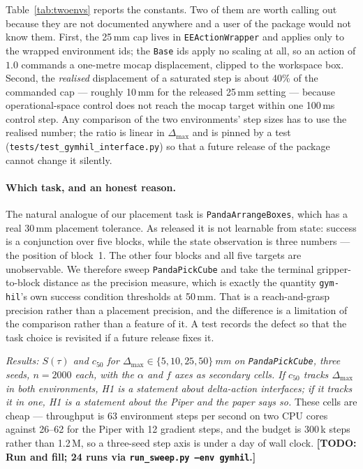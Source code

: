 \documentclass{article}
\newcommand{\todo}[1]{{\color{red}\textbf{[TODO: #1]}}}
\newcommand{\planned}[1]{{\color{blue!70!black}\textit{#1}}}
\newcommand{\dmax}{\Delta_{\max}}
\begin{document}
Table~\ref{tab:twoenvs} reports the constants. Two of them are worth
calling out because they are not documented anywhere and a user of the package
would not know them. First, the 25\,mm cap lives in \texttt{EEActionWrapper}
and applies only to the wrapped environment ids; the \texttt{Base} ids apply no
scaling at all, so an action of $1.0$ commands a one-metre mocap displacement,
clipped to the workspace box. Second, the \emph{realised} displacement of a
saturated step is about 40\% of the commanded cap --- roughly 10\,mm for the
released 25\,mm setting --- because operational-space control does not reach the
mocap target within one 100\,ms control step. Any comparison of the two
environments' step sizes has to use the realised number; the ratio is linear in
$\dmax$ and is pinned by a test
(\texttt{tests/test\_gymhil\_interface.py}) so that a future release of the
package cannot change it silently.

\paragraph{Which task, and an honest reason.}
The natural analogue of our placement task is \texttt{PandaArrangeBoxes},
which has a real 30\,mm placement tolerance. As released it is not learnable
from state: success is a conjunction over five blocks, while the state
observation is three numbers --- the position of block~1. The other four blocks
and all five targets are unobservable. We therefore sweep
\texttt{PandaPickCube} and take the terminal gripper-to-block distance as the
precision measure, which is exactly the quantity \texttt{gym-hil}'s own success
condition thresholds at 50\,mm. That is a reach-and-grasp precision rather than
a placement precision, and the difference is a limitation of the comparison
rather than a feature of it. A test records the defect so that the task choice
is revisited if a future release fixes it.

\planned{Results: $S(\tau)$ and $c_{50}$ for $\dmax \in \{5, 10, 25, 50\}$\,mm
on \texttt{PandaPickCube}, three seeds, $n{=}2000$ each, with the $\alpha$ and
$f$ axes as secondary cells. If $c_{50}$ tracks $\dmax$ in both environments,
H1 is a statement about delta-action interfaces; if it tracks it in one, H1 is
a statement about the Piper and the paper says so.} These cells are cheap ---
throughput is 63 environment steps per second on two CPU cores against 26--62
for the Piper with 12 gradient steps, and the budget is 300\,k steps rather
than 1.2\,M, so a three-seed step axis is under a day of wall clock.
\todo{Run and fill; 24 runs via \texttt{run\_sweep.py --env gymhil}.}
\end{document}
